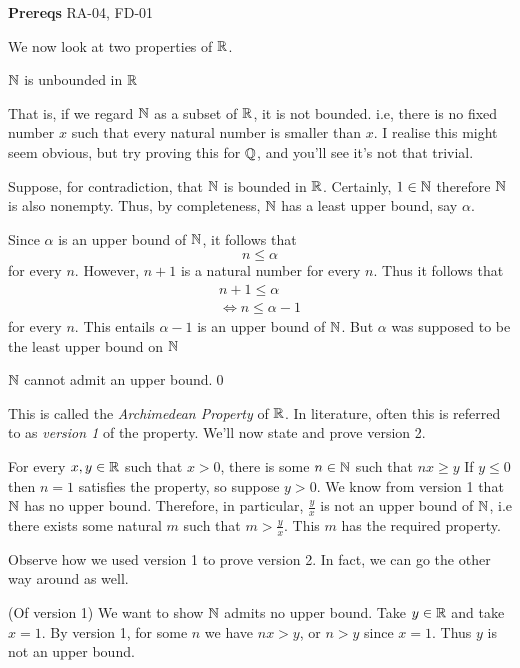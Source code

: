 

\textbf{Prereqs} RA-04, FD-01

We now look at two properties of  $\mathbb{R}$.
\begin{SNP}{\thm}{$\mathbb{N}$ is unbounded in $\mathbb{R}$}
\end{SNP}
That is, if we regard $\mathbb{N}$ as a subset of $\mathbb{R}$, it is not bounded. i.e, there is no fixed number $x$ such that every natural number is smaller than $x$. I realise this might seem obvious, but try proving this for $\mathbb{Q}$, and you'll see it's not that trivial.
\begin{smrg}
\pf Suppose, for contradiction, that $\mathbb{N}$ is bounded in $\mathbb{R}$. Certainly, $1 \in \mathbb{N}$ therefore $\mathbb{N}$ is also nonempty. Thus, by completeness, $\mathbb{N}$ has a least upper bound, say $\alpha$.

Since $\alpha$ is an upper bound of $\mathbb{N}$, it follows that 
$$n \leq \alpha$$for every $n$. However, $n + 1$ is a natural number for every $n$. Thus it follows that
\begin{align*}
n + 1 \leq \alpha\\
\iff n \leq \alpha - 1
\end{align*}
for every $n$. This entails $\alpha - 1$ is an upper bound of $\mathbb{N}$. But $\alpha$ was supposed to be the least upper bound on $\mathbb{N}$\contra

$\mathbb{N}$ cannot admit an upper bound.\qed
\end{smrg}

This is called the \emph{Archimedean Property} of $\mathbb{R}$. In literature, often this is referred to as \emph{version 1} of the property. We'll now state and prove version 2.

\begin{SWP}{\thm}{For every $x, y \in \mathbb{R}$ such that $x > 0$, there is some $n \in \mathbb{N}$ such that $nx \geq y$}
If $y \leq 0$ then $n = 1$ satisfies the property, so suppose $y > 0$. We know from version 1 that $\mathbb{N}$ has no upper bound. Therefore, in particular, $\frac{y}{x}$ is not an upper bound of $\mathbb{N}$, i.e there exists some natural $m$ such that $m > \frac{y}{x}$. This $m$ has the required property.
\end{SWP}

Observe how we used version 1 to prove version 2. In fact, we can go the other way around as well.

\begin{smrg}
\pf (Of version 1) We want to show $\mathbb{N}$ admits no upper bound. Take $y \in \mathbb{R}$ and take $x = 1$. By version 1, for some $n$ we have $nx > y$, or $n > y$ since $x = 1$. Thus $y$ is not an upper bound.
\end{smrg}

